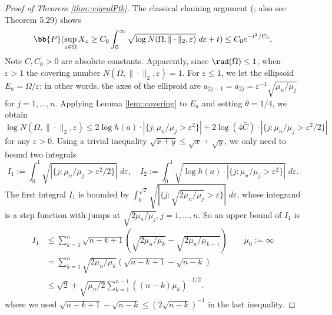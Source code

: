 \documentclass[12pt]{article}%
\theoremstyle{plain}%
\theoremstyle{remark}
\begin{document}
\begin{proof}[Proof of Theorem \ref{thm::eigvalPtb}]
The classical chaining argument (\cite{pisier1983some}; also see \cite{Van14} Theorem 5.29) shows 
\begin{equation}\label{ineqn::chain}
\bb{P}( \sup_{z \in \Omega}  X_z \ge C_0 \int_0^{\infty} \sqrt{\log N(\Omega, \| \cdot \|_2, \varepsilon)} \; d\varepsilon + t ) \le C_0e^{-t^2/C_0},
\end{equation} 
Note $C, C_0>0$ are absolute constants. Apparently, since $\rad(\Omega) \le 1$, when $\varepsilon > 1$ the covering number $N(\Omega, \| \cdot \|_2, \varepsilon) = 1$. For $\varepsilon \le 1$, we let the ellipsoid $E_a = \Omega/\varepsilon$; in other words, the axes of the ellipsoid are $a_{2j-1} = a_{2j} = \varepsilon^{-1} \sqrt{\mu_n/\mu_j} $ for $j=1, \ldots, n$. Applying Lemma \ref{lem::covering} to $E_a$ and setting $\theta = 1/4$, we obtain
\begin{equation*}
\log N(\Omega, \| \cdot \|_2, \varepsilon) \le 2\log h(a) \cdot   | \{ j: \mu_n / \mu_j > \varepsilon^2 \}|  + 2\log(4\bar{C}) \cdot | \{ j: \mu_n / \mu_j > \varepsilon^2/2 \}|
\end{equation*}
for any $\varepsilon > 0$. Using a trivial inequality $\sqrt{x + y} \le \sqrt{x} + \sqrt{y}$, we only need to bound two integrals
\begin{equation}\label{eqn::Int}
I_1:= \int_0^{1} \sqrt{ | \{ j: \mu_n / \mu_j > \varepsilon^2/2 \}| } \; d\varepsilon,  \quad 
I_2:= \int_0^1  \sqrt{ 
\log h(a) \cdot  | \{ j: \mu_n / \mu_j > \varepsilon^2 \}|}\; d\varepsilon .
\end{equation}
The first integral $I_1$ is bounded by $\int_0^{\sqrt{2}} \sqrt{ | \{ j: \sqrt{2\mu_n / \mu_j} > \varepsilon \}| } \; d\varepsilon$, whose integrand is a step function with jumps at $\sqrt{2\mu_n / \mu_j}, j=1,\ldots,n$. So an upper bound of $I_1$ is
\begin{align*}
I_1 &\le  \sum_{k=1}^n \sqrt{n-k+1} ( \sqrt{2 \mu_n / \mu_k} - \sqrt{2 \mu_n / \mu_{k-1}}) \qquad \mu_0 :=\infty \\
&= \sum_{k=1}^n \sqrt{2 \mu_n/ \mu_k} (\sqrt{n-k+1} - \sqrt{n-k})\\
&\le \sqrt{2} + \sqrt{\mu_n/2} \sum_{k=1}^{n-1} ( (n-k) \mu_k)^{-1/2}.
\end{align*}
where we used $\sqrt{n-k+1} - \sqrt{n-k} \le (2\sqrt{n-k})^{-1}$ in the last inequality.



\end{proof}
\end{document}
